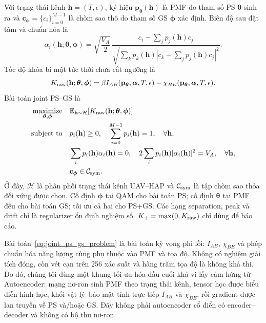 Với trạng thái kênh \(\mathbf h=(T,\epsilon)\), ký hiệu \(\mathbf p_{\boldsymbol\theta}(\mathbf h)\) là PMF do tham số PS \(\boldsymbol\theta\) sinh ra và \(\mathbf c_{\boldsymbol\phi}=\{c_i\}_{i=0}^{M-1}\) là chòm sao thô do tham số GS \(\boldsymbol\phi\) xác định. Biên độ sau đặt tâm và chuẩn hóa là
\begin{equation}
\alpha_i(\mathbf h;\boldsymbol\theta,\boldsymbol\phi)
=\sqrt{\frac{V_A}{2}}\,
\frac{c_i-\sum_jp_j(\mathbf h)c_j}
{\sqrt{\sum_kp_k(\mathbf h)
\left|c_k-\sum_jp_j(\mathbf h)c_j\right|^2}}.
\end{equation}
Tốc độ khóa bí mật tức thời chưa cắt ngưỡng là
\begin{equation}
K_{\rm raw}(\mathbf h;\boldsymbol\theta,\boldsymbol\phi)
=\beta I_{AB}(\mathbf p_{\boldsymbol\theta},\boldsymbol\alpha,T,\epsilon)
-\chi_{BE}(\mathbf p_{\boldsymbol\theta},\boldsymbol\alpha,T,\epsilon).
\end{equation}
Bài toán joint PS--GS là
\begin{align}
\underset{\boldsymbol\theta,\boldsymbol\phi}{\operatorname{maximize}}
\quad&
\mathbb E_{\mathbf h\sim\mathcal H}
[K_{\rm raw}(\mathbf h;\boldsymbol\theta,\boldsymbol\phi)]
\label{eq:joint_ps_gs_problem}\\
\operatorname{subject\ to}\quad&
p_i(\mathbf h)\geq0,\quad \sum_{i=0}^{M-1}p_i(\mathbf h)=1,
\quad \forall\mathbf h,\nonumber\\
&\sum_i p_i(\mathbf h)\alpha_i(\mathbf h)=0,\quad
2\sum_i p_i(\mathbf h)|\alpha_i(\mathbf h)|^2=V_A,
\quad \forall\mathbf h,\nonumber\\
&\mathbf c_{\boldsymbol\phi}\in\mathcal C_{\rm sym}.\nonumber
\end{align}
Ở đây, \(\mathcal H\) là phân phối trạng thái kênh UAV--HAP và \(\mathcal C_{\rm sym}\) là tập chòm sao thỏa đối xứng được chọn. Cố định \(\boldsymbol\phi\) tại QAM cho bài toán PS; cố định \(\boldsymbol\theta\) tại PMF đều cho bài toán GS; tối ưu cả hai cho PS+GS. Các hạng separation, peak và drift chỉ là regularizer ổn định nghiệm số. \(K_+=\max(0,K_{\rm raw})\) chỉ dùng để báo cáo.

Bài toán~\eqref{eq:joint_ps_gs_problem} là bài toán kỳ vọng phi lồi: \(I_{AB}\), \(\chi_{BE}\) và phép chuẩn hóa năng lượng cùng phụ thuộc vào PMF và tọa độ. Không có nghiệm giải tích đóng, còn vét cạn trên 256 xác suất và hàng trăm tọa độ là không khả thi. Do đó, chúng tôi dùng một khung tối ưu hóa đầu cuối khả vi lấy cảm hứng từ Autoencoder: mạng nơ-ron sinh PMF theo trạng thái kênh, tensor học được biểu diễn hình học, khối vật lý--bảo mật tính trực tiếp \(I_{AB}\) và \(\chi_{BE}\), rồi gradient được lan truyền về PS và/hoặc GS. Đây không phải autoencoder cổ điển có encoder--decoder và không có bộ thu nơ-ron.

